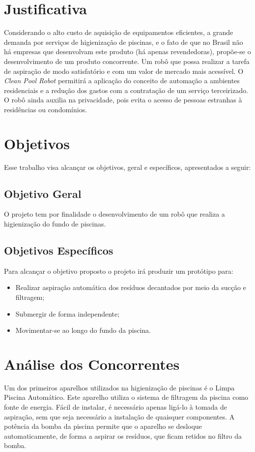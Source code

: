 \section{Justificativa}
Considerando o alto custo de aquisição de equipamentos eficientes, a grande 
demanda por serviços de higienização de piscinas, e o fato de que no Brasil não
há empresas que desenvolvam este produto (há apenas revendedoras), propõe-se o 
desenvolvimento de um produto concorrente. Um robô  que possa realizar a tarefa
de aspiração de  modo satisfatório e com um valor de mercado mais acessível. O 
\textit{Clean Pool Robot} permitirá a aplicação do conceito de automação a 
ambientes residenciais e a redução dos gastos com a contratação de um serviço 
terceirizado. O robô ainda auxilia na privacidade, pois evita o acesso de 
pessoas estranhas à residências ou condomínios. 

\section{Objetivos}
Esse trabalho visa alcançar os objetivos, geral e específicos, apresentados a 
seguir:

\subsection{Objetivo Geral}
O projeto tem por finalidade o desenvolvimento de um robô que realiza a higienização
do fundo de piscinas.

\subsection{Objetivos Específicos}
Para alcançar o objetivo proposto o projeto irá produzir um protótipo para:
\begin{itemize}
  \item Realizar aspiração automática dos resíduos decantados por meio da sucção e filtragem;
  \item Submergir de forma independente;
  \item Movimentar-se ao longo do fundo da piscina.
 
\end{itemize}

\section{Análise dos Concorrentes}
Um dos primeiros aparelhos utilizados na higienização de piscinas é o Limpa 
Piscina Automático. Este aparelho utiliza o sistema de filtragem da piscina 
como fonte de energia. Fácil de instalar, é necessário apenas ligá-lo à tomada
de aspiração, sem que seja necessário a instalação de quaisquer componentes. 
A potência da bomba da piscina permite que o aparelho se desloque 
automaticamente, de forma a aspirar os resíduos, que ficam retidos no filtro 
da bomba.


